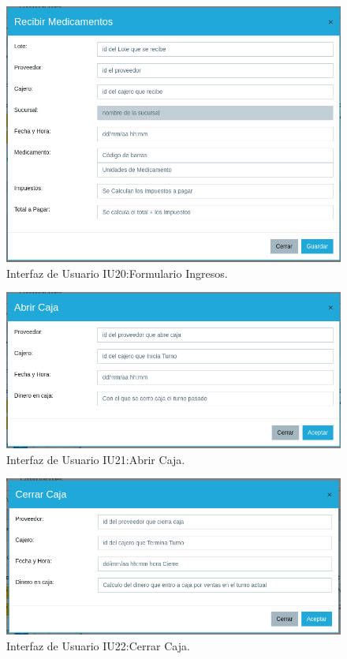 \begin{figure}[htbp!]
	\begin{center}
\includegraphics[width=\textwidth]{Pantallas/FormularioIngreso}
		\caption{Interfaz de Usuario IU20:Formulario Ingresos.}
	\end{center}
\end{figure}


\begin{figure}[htbp!]
	\begin{center}
\includegraphics[width=\textwidth]{Pantallas/AbrirCaja}
		\caption{Interfaz de Usuario IU21:Abrir Caja.}
	\end{center}
\end{figure}

\begin{figure}[htbp!]
	\begin{center}
\includegraphics[width=\textwidth]{Pantallas/CerrarCaja}
		\caption{Interfaz de Usuario IU22:Cerrar Caja.}
	\end{center}
\end{figure}

